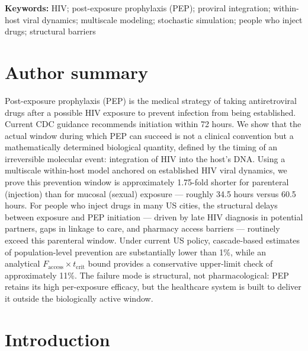 \documentclass[10pt,letterpaper]{article}
\newenvironment{keywords}{\par\noindent\textbf{Keywords: }\ignorespaces}{\par}
\theoremstyle{definition}
\theoremstyle{remark}
\newcommand{\Faccess}{F_{\text{access}}}
\newcommand{\tcrit}{t_{\text{crit}}}
\begin{document}
\begin{keywords}
HIV; post-exposure prophylaxis (PEP); proviral integration; within-host viral dynamics; multiscale modeling; stochastic simulation; people who inject drugs; structural barriers
\end{keywords}

\section*{Author summary}
Post-exposure prophylaxis (PEP) is the medical strategy of taking antiretroviral drugs after a possible HIV exposure to prevent infection from being established. Current CDC guidance recommends initiation within 72 hours. We show that the actual window during which PEP can succeed is not a clinical convention but a mathematically determined biological quantity, defined by the timing of an irreversible molecular event: integration of HIV into the host's DNA. Using a multiscale within-host model anchored on established HIV viral dynamics, we prove this prevention window is approximately 1.75-fold shorter for parenteral (injection) than for mucosal (sexual) exposure --- roughly 34.5 hours versus 60.5 hours. For people who inject drugs in many US cities, the structural delays between exposure and PEP initiation --- driven by late HIV diagnosis in potential partners, gaps in linkage to care, and pharmacy access barriers --- routinely exceed this parenteral window. Under current US policy, cascade-based estimates of population-level prevention are substantially lower than 1\%, while an analytical $\Faccess \times \tcrit$ bound provides a conservative upper-limit check of approximately 11\%. The failure mode is structural, not pharmacological: PEP retains its high per-exposure efficacy, but the healthcare system is built to deliver it outside the biologically active window.



\section*{Introduction}
\end{document}
